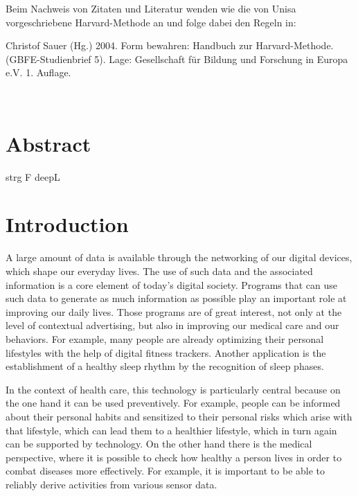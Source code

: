 \documentclass[a4paper,12pt]{scrartcl}
\begin{document}
\begin{singlespace}
\begin{titlepage}
\begin{flushright}
\begin{large}
\begin{tabular}{rl}
		\end{tabular}
		\end{large}	
\end{flushright}
	
\flushleft
\end{titlepage}

\newpage  \tableofcontents \thispagestyle{empty} \vspace{15mm}
\begin{center}
	\parbox{.8\linewidth}{\begin{small}
			{Beim Nachweis von Zitaten und Literatur wenden wie die von Unisa 
				vorgeschriebene Harvard-Methode an und folge dabei den Regeln 
				in: 
				
				Christof Sauer (Hg.) 2004. 
				Form bewahren: Handbuch zur 
				Harvard-Methode. 
				(GBFE-Studienbrief 5). Lage: Gesellschaft für 
				Bildung und Forschung in Europa e.V. 1. Auflage.} \\
			
			\end{small}}
\end{center}

\end{singlespace}
\newpage
\setcounter{page}{1}

\section*{Abstract}

strg F deepL

\section{Introduction}
A large amount of data is available through the networking of our digital devices, which shape our everyday lives. The use of such data and the associated information is a core element of today's digital society. Programs that can use such data to generate as much information as possible play an important role at improving our daily lives. Those programs are of great interest, not only at the level of contextual advertising, but also in improving our medical care and our behaviors. For example, many people are already optimizing their personal lifestyles with the help of digital fitness trackers. Another application is the establishment of a healthy sleep rhythm by the recognition of sleep phases. 

In the context of health care, this technology is particularly central because on the one hand it can be used preventively. For example, people can be informed about their personal habits and sensitized to their personal risks which arise with that lifestyle, which can lead them to a healthier lifestyle, which in turn again can be supported by technology. On the other hand there is the medical perspective, where it is possible to check how healthy a person lives in order to combat diseases more effectively. For example, it is important to be able to reliably derive activities from various sensor data. 
\end{document}
